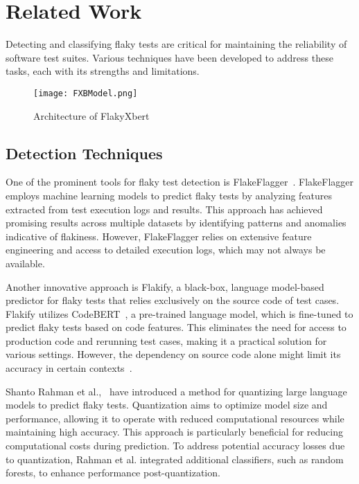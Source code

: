 \section{Related Work}
\label{sec:Related Work}

Detecting and classifying flaky tests are critical for maintaining the reliability of software test suites. Various techniques have been developed to address these tasks, each with its strengths and limitations.
\vspace{2mm}
\begin{figure*}[t!]
    \centering
    \texttt{[image: FXBModel.png]} %
    \caption{Architecture of FlakyXbert}
    \label{fig:flakyxbert}
\end{figure*}

\subsection{Detection Techniques}

One of the prominent tools for flaky test detection is FlakeFlagger~\cite{Alshammari21}. FlakeFlagger employs machine learning models to predict flaky tests by analyzing features extracted from test execution logs and results. This approach has achieved promising results across multiple datasets by identifying patterns and anomalies indicative of flakiness. However, FlakeFlagger relies on extensive feature engineering and access to detailed execution logs, which may not always be available.

Another innovative approach is Flakify, a black-box, language model-based predictor for flaky tests that relies exclusively on the source code of test cases. Flakify utilizes CodeBERT~\cite{Guo2020CodeBERT}, a pre-trained language model, which is fine-tuned to predict flaky tests based on code features. This eliminates the need for access to production code and rerunning test cases, making it a practical solution for various settings. However, the dependency on source code alone might limit its accuracy in certain contexts~\cite{fatima2023}.

Shanto Rahman et al.,~\cite{rahman2024} have introduced a method for quantizing large language models to predict flaky tests. Quantization aims to optimize model size and performance, allowing it to operate with reduced computational resources while maintaining high accuracy. This approach is particularly beneficial for reducing computational costs during prediction. To address potential accuracy losses due to quantization, Rahman et al. integrated additional classifiers, such as random forests, to enhance performance post-quantization.



